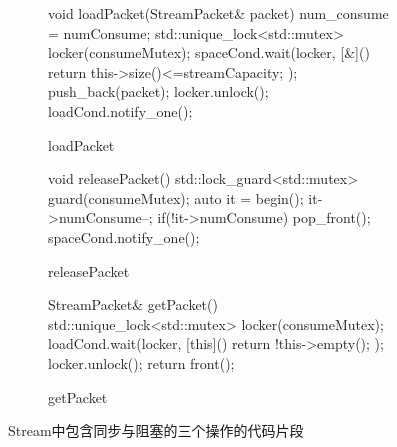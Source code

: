 \begin{figure}[!htp]
  \centering
  \begin{subfigure}{0.32\textwidth}
    \centering
    
\begin{codeblock}[language=C, basicstyle=\tiny]
void loadPacket(StreamPacket& packet) 
{
    num_consume = numConsume;
    std::unique_lock<std::mutex> locker(consumeMutex);
    spaceCond.wait(locker, [&](){
        return this->size()<=streamCapacity;
    });
    push_back(packet);
    locker.unlock();
    loadCond.notify_one();
}
\end{codeblock}

    \caption{loadPacket}
  \end{subfigure}
  \begin{subfigure}{0.32\textwidth}
    \centering
    
\begin{codeblock}[language=C, basicstyle=\tiny]
void releasePacket()
{
    {
        std::lock_guard<std::mutex> guard(consumeMutex);
        auto it = begin();
        it->numConsume--;
        if(!it->numConsume)
            pop_front();
    }
    spaceCond.notify_one();
}
\end{codeblock}

    \caption{releasePacket}
  \end{subfigure}
  \begin{subfigure}{0.32\textwidth}
    \centering
    
\begin{codeblock}[language=C, basicstyle=\tiny]
StreamPacket& getPacket()
{
    std::unique_lock<std::mutex> locker(consumeMutex);
    loadCond.wait(locker, [this](){ 
        return !this->empty();
    });
    locker.unlock();
    return front();
}
\end{codeblock}

    \caption{getPacket}
  \end{subfigure}
  
  \caption{Stream中包含同步与阻塞的三个操作的代码片段}
  \label{fig:stream_code}
\end{figure}


